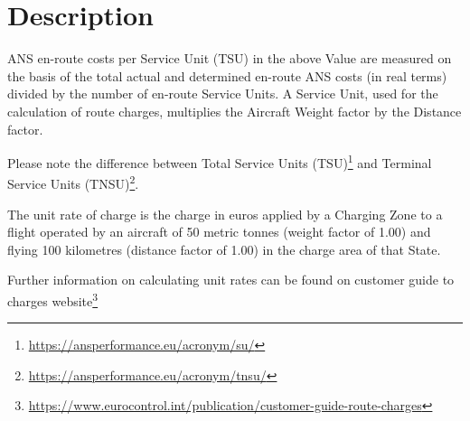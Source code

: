 \documentclass[
  11pt,
  a4paper,
]{book}
\DeclareRobustCommand{\href}[2]{#2\footnote{\url{#1}}}
\begin{document}
\hypertarget{description-3}{%
\section{Description}\label{description-3}}

ANS en-route costs per Service Unit (TSU) in the above Value are
measured on the basis of the total actual and determined en-route ANS
costs (in real terms) divided by the number of en-route Service Units. A
Service Unit, used for the calculation of route charges, multiplies the
Aircraft Weight factor by the Distance factor.

\begin{tcolorbox}[enhanced jigsaw, colframe=quarto-callout-note-color-frame, colback=white, toptitle=1mm, coltitle=black, leftrule=.75mm, title=\textcolor{quarto-callout-note-color}{\faInfo}\hspace{0.5em}{Note}, left=2mm, rightrule=.15mm, bottomtitle=1mm, breakable, titlerule=0mm, arc=.35mm, colbacktitle=quarto-callout-note-color!10!white, bottomrule=.15mm, opacityback=0, opacitybacktitle=0.6, toprule=.15mm]

Please note the difference between
\href{https://ansperformance.eu/acronym/su/}{Total Service Units (TSU)}
and \href{https://ansperformance.eu/acronym/tnsu/}{Terminal Service
Units (TNSU)}.

\end{tcolorbox}

\begin{tcolorbox}[enhanced jigsaw, colframe=quarto-callout-note-color-frame, colback=white, toptitle=1mm, coltitle=black, leftrule=.75mm, title=\textcolor{quarto-callout-note-color}{\faInfo}\hspace{0.5em}{Note}, left=2mm, rightrule=.15mm, bottomtitle=1mm, breakable, titlerule=0mm, arc=.35mm, colbacktitle=quarto-callout-note-color!10!white, bottomrule=.15mm, opacityback=0, opacitybacktitle=0.6, toprule=.15mm]

The unit rate of charge is the charge in euros applied by a Charging
Zone to a flight operated by an aircraft of 50 metric tonnes (weight
factor of 1.00) and flying 100 kilometres (distance factor of 1.00) in
the charge area of that State.

Further information on calculating unit rates can be found on
\href{https://www.eurocontrol.int/publication/customer-guide-route-charges}{customer
guide to charges website}

\end{tcolorbox}
\end{document}
